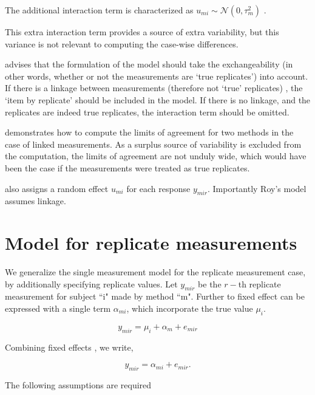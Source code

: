 The additional interaction term is characterized as $u_{mi}  \sim \mathcal{N}(0, \tau^2_m)$ \citep{bxc2008}.

This extra interaction term provides a source of extra variability, but this variance is not relevant to computing the case-wise differences.

\citet{bxc2008} advises that the formulation of the model should take the exchangeability (in other words, whether or not the measurements are `true replicates') into account. If there is a linkage between measurements (therefore not `true' replicates) , the `item by replicate' should be included in the model. If there is no linkage, and the replicates are indeed true replicates, the interaction term should be omitted.

\citet{bxc2008} demonstrates how to compute the limits of agreement for two methods in the case of linked measurements. As a surplus source of variability is excluded from the computation, the limits of agreement are not unduly wide, which would have been the case if the measurements were treated as true replicates.

\citet{Roy} also assigns a random effect $u_{mi}$ for each response $y_{mir}$. Importantly Roy's model assumes linkage.

\section{Model for replicate measurements}

We generalize the single measurement model for the replicate measurement case, by additionally specifying replicate values. Let $y_{mir}$ be the $r-$th replicate measurement for subject ``i" made by method ``m". Further to \citet{barnhart} fixed effect can be expressed with a single term $\alpha_{mi}$, which incorporate the true value $\mu_i$.

\[ y_{mir} = \mu_{i} + \alpha_{m} + e_{mir}  \]

Combining fixed effects \citep{barnhart}, we write,

\[ y_{mir} = \alpha_{mi} + e_{mir}.\]

The following assumptions are required

